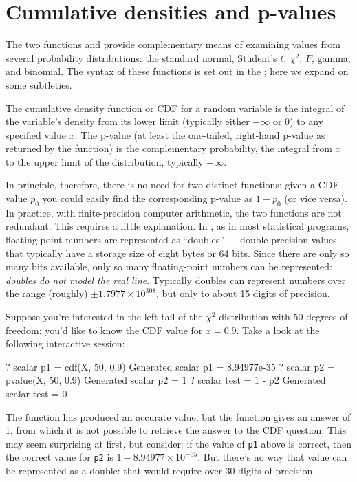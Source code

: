 \section{Cumulative densities and p-values}
\label{sec:genr-cdf}

The two functions  and  provide complementary
means of examining values from several probability distributions: the
standard normal, Student's $t$, $\chi^2$, $F$, gamma, and binomial.
The syntax of these functions is set out in the \GCR; here we expand
on some subtleties.

The cumulative density function or CDF for a random variable
is the integral of the variable's density from its lower limit
(typically either $-\infty$ or 0) to any specified value $x$.  The
p-value (at least the one-tailed, right-hand p-value as returned by
the  function) is the complementary probability, the
integral from $x$ to the upper limit of the distribution, typically
$+\infty$.  

In principle, therefore, there is no need for two distinct functions:
given a CDF value $p_0$ you could easily find the corresponding
p-value as $1-p_0$ (or vice versa).  In practice, with
finite-precision computer arithmetic, the two functions are not
redundant.  This requires a little explanation.  In , as in
most statistical programs, floating point numbers are represented as
``doubles'' --- double-precision values that typically have a storage
size of eight bytes or 64 bits.  Since there are only so many bits
available, only so many floating-point numbers can be represented:
\textit{doubles do not model the real line}.  Typically doubles can
represent numbers over the range (roughly) $\pm 1.7977 \times
10^{308}$, but only to about 15 digits of precision.

Suppose you're interested in the left tail of the $\chi^2$ distribution
with 50 degrees of freedom: you'd like to know the CDF value for $x =
0.9$.  Take a look at the following interactive session: 
\begin{code}
? scalar p1 = cdf(X, 50, 0.9)
Generated scalar p1 = 8.94977e-35
? scalar p2 = pvalue(X, 50, 0.9)
Generated scalar p2 = 1
? scalar test = 1 - p2
Generated scalar test = 0
\end{code}

The  function has produced an accurate value, but the
 function gives an answer of 1, from which it is not
possible to retrieve the answer to the CDF question.  This may seem
surprising at first, but consider: if the value of \texttt{p1} above
is correct, then the correct value for \texttt{p2} is $1 - 8.94977
\times 10^{-35}$.  But there's no way that value can be represented as
a double: that would require over 30 digits of precision.

